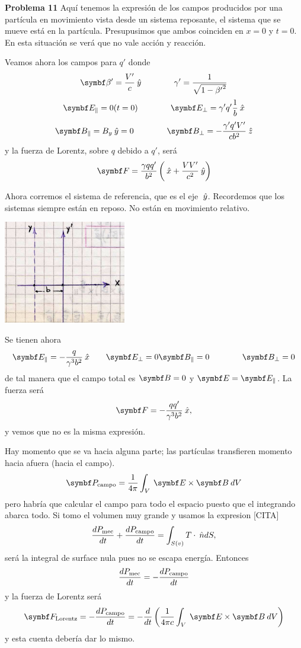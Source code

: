 \documentclass[10pt,oneside]{CBFT_book}
\begin{document}
\begin{ejemplo}{\bf Problema 11}
Aquí tenemos la expresión de los campos producidos por una partícula en movimiento vista
desde un sistema reposante, el sistema que se mueve está en la partícula.
Presupusimos que ambos coinciden en $x=0$ y $t=0$.
En esta situación se verá que no vale acción y reacción.

Veamos ahora los campos para $q'$ donde 
\[
	\vb{\beta}' = \frac{V'}{c}\yver \qquad \qquad \gamma' = \frac{1}{\sqrt{ 1 - {\beta'}^2}}
\]
\[
	\vb{E}_\parallel = 0 (t=0)  \qquad \qquad  
	\vb{E}_\perp = \gamma' q' \frac{1}{b} \xver 
\]
\[
	\vb{B}_\parallel = B_y \yver = 0 \qquad \qquad  
	\vb{B}_\perp = - \frac{\gamma' q' V' }{cb^2} \zver 
\]  
y la fuerza de Lorentz, sobre $q$ debido a $q'$, será
\[
	\vb{F} = \frac{\gamma q q'}{b^2}\left( \xver + \frac{VV'}{c^2} \yver \right)
\]
 
Ahora corremos el sistema de referencia, que es el eje $\:\hat{y}$. Recordemos que los sistemas
siempre están en reposo. No están en movimiento relativo.

\includegraphics[width=0.4\textwidth]{images/fig_ft1_speRel_prob11B.jpg} 

Se tienen ahora
\[
	\vb{E}_\parallel = - \frac{ q }{ \gamma^3 b^2} \xver \qquad \vb{E}_\perp = 0 
	\vb{B}_\parallel = 0 \qquad \qquad  \vb{B}_\perp = 0
\]
de tal manera que el campo total es $\vb{B}=0$ y $\vb{E}=\vb{E}_\parallel$.
La fuerza será
\[
	\vb{F} = - \frac{q q'}{\gamma^3 b^2} \xver ,
\]
y vemos que no es la misma expresión.

Hay momento que se va hacia alguna parte; las partículas transfieren momento hacia afuera
(hacia el campo).
\[
	\vb{P}_\text{campo} = \frac{1}{4\pi} \int_V \: \pv{E}{B} \: dV
\]
pero habría que calcular el campo para todo el espacio puesto que el integrando abarca todo.
Si tomo el volumen muy grande y usamos la expresion [CITA]
\[
	\frac{d^{\hspace{-0.05em}} {P_\text{mec}}}{d {t}^{\hspace{-0.05em}}} + \frac{d^{\hspace{-0.05em}} {P_\text{campo}}}{d {t}^{\hspace{-0.05em}}}  = \int_{S(v)} T \cdot \:\hat{n} dS,
\]
será la integral de surface nula pues no se escapa energía. Entonces
\[
	\frac{d^{\hspace{-0.05em}} {P_\text{mec}}}{d {t}^{\hspace{-0.05em}}} = - \frac{d^{\hspace{-0.05em}} {P_\text{campo}}}{d {t}^{\hspace{-0.05em}}}
\]
y la fuerza de Lorentz será
\[
	\vb{F}_\text{Lorentz} = - \dtot{P_\text{campo}}{t} = 
	-\dtot{}{t}\left( \frac{1}{4 \pi c} \int_V \: \pv{E}{B} \: dV \right)
\]
y esta cuenta debería dar lo mismo.
 
\end{ejemplo}
\end{document}
